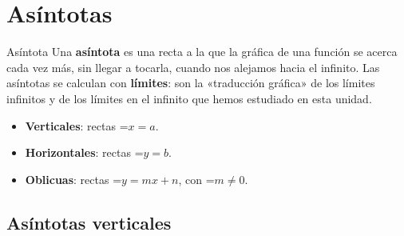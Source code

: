 \documentclass[11pt,a4paper]{article}
\newcommand{\fmm}[1]{\setbox0=\hbox{$#1$}\ifdim\wd0>\linewidth\fmdisp{#1}\else\mbox{\box0}\fi}
\newcommand{\fmdisp}[1]{\[\setbox2=\hbox{$\displaystyle #1$}\ifdim\wd2>\linewidth\resizebox{\linewidth}{!}{\box2}\else\box2\fi\]}
\begin{document}
\section{Asíntotas}\hypertarget{sec13}{}

\begin{fmdef}{Asíntota}
Una \textbf{asíntota} es una recta a la que la gráfica de una función se acerca cada vez más, sin llegar a tocarla, cuando nos alejamos hacia el infinito. Las asíntotas se calculan con \textbf{límites}: son la «traducción gráfica» de los límites infinitos y de los límites en el infinito que hemos estudiado en esta unidad.

\begin{itemize}
\item \textbf{Verticales}: rectas \fmm{x=a}.
\item \textbf{Horizontales}: rectas \fmm{y=b}.
\item \textbf{Oblicuas}: rectas \fmm{y=mx+n}, con \fmm{m\neq0}.
\end{itemize}
\end{fmdef}

\subsection*{Asíntotas verticales}
\end{document}
